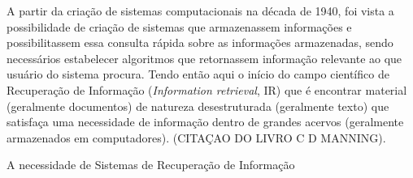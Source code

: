
A partir da criação de sistemas computacionais na década de 1940, foi vista a possibilidade de criação de sistemas que armazenassem informações e possibilitassem essa consulta rápida sobre as informações armazenadas, sendo necessários estabelecer algoritmos que retornassem informação relevante ao que usuário do sistema procura. Tendo então aqui o início do campo científico de Recuperação de Informação (\textit{Information retrieval}, IR) que é encontrar material (geralmente documentos) de natureza desestruturada (geralmente texto) que satisfaça uma necessidade de informação dentro de grandes acervos (geralmente armazenados em computadores). (CITAÇAO DO LIVRO C D MANNING).

A necessidade de Sistemas de Recuperação de Informação 



